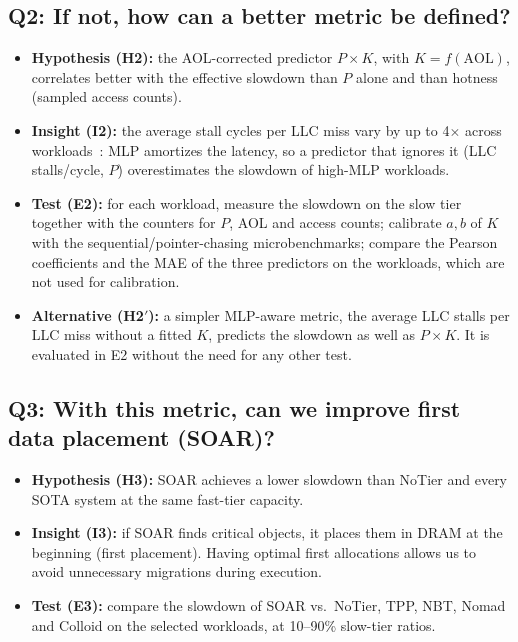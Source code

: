\documentclass[conference]{IEEEtran}
\begin{document}
\subsection{Q2: If not, how can a better metric be defined?}
\begin{itemize}
  \item \textbf{Hypothesis (H2):} the AOL-corrected predictor $P\times K$,
        with $K = f(\text{AOL})$, correlates
        better with the effective slowdown than $P$ alone and than hotness
        (sampled access counts).
  \item \textbf{Insight (I2):} the average stall cycles per LLC miss vary by
        up to 4$\times$ across workloads~\cite{liu2025tiered}: MLP amortizes
        the latency, so a predictor that ignores it (LLC stalls/cycle, $P$)
        overestimates the slowdown of high-MLP workloads.
  \item \textbf{Test (E2):} for each workload, measure the slowdown on the
        slow tier together with the counters for $P$, AOL and access counts;
        calibrate $a,b$ of $K$ with the sequential/pointer-chasing
        microbenchmarks; compare the Pearson coefficients and the MAE of the
        three predictors on the workloads, which are not used for calibration.
  \item \textbf{Alternative (H2$'$):} a simpler MLP-aware metric, the
        average LLC stalls per LLC miss without a fitted $K$, predicts the
        slowdown as well as $P\times K$. It is evaluated in E2 without the need for any other test.
\end{itemize}

\subsection{Q3: With this metric, can we improve first data placement (SOAR)?}
\begin{itemize}
  \item \textbf{Hypothesis (H3):} SOAR achieves a lower slowdown than NoTier
        and every SOTA system at the same fast-tier capacity.
  \item \textbf{Insight (I3):} if SOAR finds critical
        objects, it places them in DRAM at the beginning (first placement).
        Having optimal first allocations allows us to avoid unnecessary migrations during execution.
  \item \textbf{Test (E3):} compare the slowdown of SOAR vs.\ NoTier, TPP,
        NBT, Nomad and Colloid on the selected workloads, at 10--90\%
        slow-tier ratios.

\end{itemize}
\end{document}
